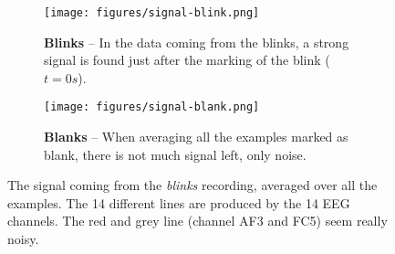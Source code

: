\begin{figure}[h]
    \centering
    \begin{subfigure}{0.5\textwidth}
        \centering
        \captionsetup{width = 0.9\linewidth}
        \texttt{[image: figures/signal-blink.png]}
        \caption{\textbf{Blinks} -- In the data coming from the blinks, a strong signal is found just after the marking of the blink ($t=0s$).}
        \label{fig:blink}
    \end{subfigure}%
    \begin{subfigure}{0.5\textwidth}
        \centering
        \captionsetup{width = 0.9\linewidth}
        \texttt{[image: figures/signal-blank.png]}
        \caption{\textbf{Blanks} -- When averaging all the examples marked as blank, there is not much signal left, only noise.}
        \label{fig:blank}
    \end{subfigure}%
    \caption{The signal coming from the \textit{blinks} recording, averaged over all the examples. The 14 different lines are produced by the 14 EEG channels. The red and grey line (channel \textsc{AF3} and \textsc{FC5}) seem really noisy.}
    \label{fig:blink-blank}
\end{figure}